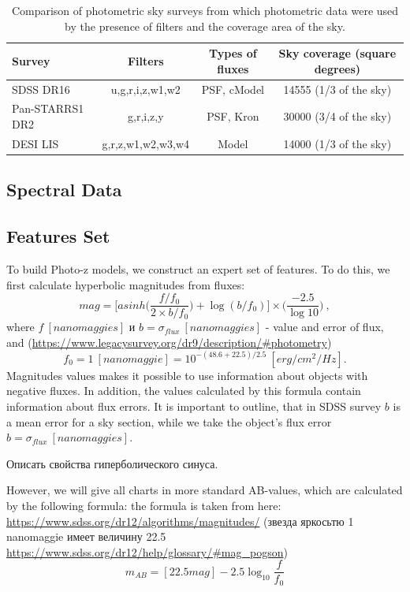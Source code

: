 \documentclass[fleqn,usenatbib]{mnras}
\begin{document}
\begin{table}
    \caption{Comparison of photometric sky surveys from which photometric data were used by the presence of filters and the coverage area of the sky.}
    \label{tab:catalogs_comparison}
    \centering
    \begin{tabular}{|l|c|c|c|}
    \hline
        Survey & Filters & Types of fluxes & Sky coverage (square degrees) \\
    \hline
        SDSS DR16 & u,g,r,i,z,w1,w2 & PSF, cModel & 14555 (1/3 of the sky) \\
        Pan-STARRS1 DR2 & g,r,i,z,y & PSF, Kron & 30000 (3/4 of the sky) \\
        DESI LIS & g,r,z,w1,w2,w3,w4 & Model & 14000 (1/3 of the sky) \\[1ex]
        \hline
    \end{tabular}
\end{table}

\subsection{Spectral Data}


\subsection{Features Set}
To build Photo-z models, we construct an expert set of features. To do this, we first calculate hyperbolic magnitudes from fluxes:
\begin{equation}\label{eq:asinhmag}
    mag = \Bigg[asinh\Bigg(\frac{f/f_0}{2 \times b/f_0}\Bigg) + \log(b/f_0)\Bigg] \times \Bigg(\frac{-2.5}{\log 10}\Bigg) ~,
\end{equation}
where $f~[nanomaggies]$ и $b = \sigma_{flux}~[nanomaggies]$ - value and error of flux, and (\url{https://www.legacysurvey.org/dr9/description/#photometry})
\begin{equation}
    f_0 = 1~[nanomaggie] = 10^{-(48.6+22.5)/2.5}~[erg/cm^2/Hz].
\end{equation}
Magnitudes values makes it possible to use information about objects with negative fluxes. In addition, the values calculated by this formula contain information about flux errors. It is important to outline, that in SDSS survey $b$ is a mean error for a sky section, while we take the object's flux error $b = \sigma_{flux}~[nanomaggies]$.

Описать свойства гиперболического синуса.

However, we will give all charts in more standard AB-values, which are calculated by the following formula: the formula is taken from here: \url{https://www.sdss.org/dr12/algorithms/magnitudes/} (звезда яркосьтю 1 nanomaggie имеет величину 22.5 \url{https://www.sdss.org/dr12/help/glossary/#mag_pogson})
\begin{equation}\label{eq:mag_ab}
    m_{AB} = [22.5 mag] - 2.5 \log_{10} \frac{f}{f_0}
\end{equation}
\end{document}

